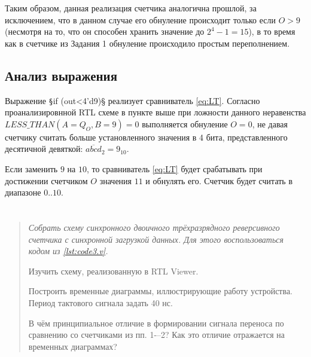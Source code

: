 Таким образом, данная реализация счетчика аналогична прошлой, за исключением, что в данном случае его обнуление происходит только если $O>9$ (несмотря на то, что он способен хранить значение до $2^4-1=15$), в то время как в счетчике из Задания 1 обнуление происходило простым переполнением.

\subsection*{Анализ выражения}

Выражение \texttt§if (out<4'd9)§ реализует сравниватель \cref{eq:LT}. Согласно проанализировнной RTL схеме в пункте выше при ложности данного неравенства $LESS\_THAN(A=Q_O, B=9)=0$ выполняется обнуление $O=0$, не давая счетчику считать больше установленного значения в 4 бита, представленного десятичной девяткой: $\overline{abcd}_2=9_{10}$.

Если заменить $9$ на $10$, то сравниватель \cref{eq:LT} будет срабатывать при достижении счетчиком $O$ значения $11$ и обнулять его. Счетчик будет считать в диапазоне $0..10$.

\section*{  }
\begin{quote}
    {\itshape
        Собрать схему синхронного двоичного трёхразрядного реверсивного счетчика с синхронной загрузкой данных. Для этого воспользоваться кодом из \cref{lst:code3.v}.

        Изучить схему, реализованную в RTL Viewer.

        Построить временные диаграммы, иллюстрирующие работу устройства. Период тактового сигнала задать 40 нс.

        В чём принципиальное отличие в формировании сигнала переноса по сравнению со счетчиками из пп. 1-–2? Как это отличие отражается на временных диаграммах?
    }
\end{quote}
\begin{codemultipage}
    \nopagebreak
    \inputminted{verilog}{scripts/code3.v}
\end{codemultipage}

